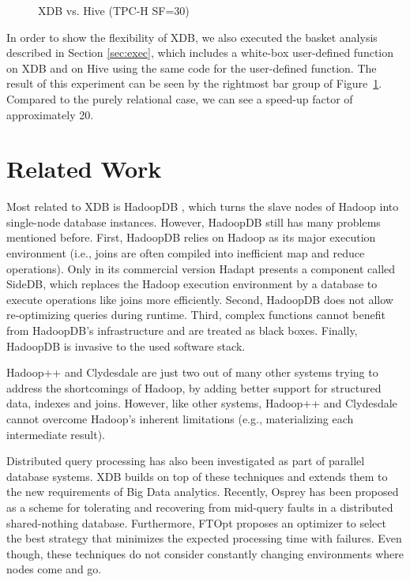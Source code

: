\documentclass{sig-alternate}
\begin{document}
\begin{figure}[ht] 
\hspace{-4ex}
\vspace{-3ex}
\caption{XDB vs. Hive (TPC-H SF=30)}
\vspace{-1ex}
\label{fig:perf}
\end{figure}

In order to show the flexibility of XDB, we also executed the basket analysis described in Section \ref{sec:exec}, which includes a white-box user-defined function on XDB and on Hive using the same code for the user-defined function. The result of this experiment can be seen by the rightmost bar group of Figure~\ref{fig:perf}. Compared to the purely relational case, we can see a speed-up factor of approximately 20. 

\section{Related Work}
\label{sec:rel}

Most related to XDB is HadoopDB \cite{HadoopDB:SIGMOD:2010}, which turns the slave nodes of Hadoop into single-node database instances. However, HadoopDB still has many problems mentioned before. First, HadoopDB relies on Hadoop as its major execution environment (i.e., joins are often compiled into inefficient map and reduce operations). Only in its commercial version Hadapt \cite{Hadapt:SIGMOD:2011} presents a component called SideDB, which replaces the Hadoop execution environment by a database to execute operations like joins more efficiently. Second, HadoopDB does not allow re-optimizing queries during runtime. Third, complex functions cannot benefit from HadoopDB's infrastructure and are treated as black boxes. Finally, HadoopDB is invasive to the used software stack. 

Hadoop++ \cite{HadoopPP:PVLDB:2010} and 	Clydesdale \cite{Clydesdale:EDBT:2012} are just two out of many other systems trying to address the shortcomings of Hadoop, by adding better support for structured data, indexes and joins. However, like other systems, Hadoop++ and Clydesdale cannot overcome Hadoop's inherent limitations (e.g., materializing each intermediate result).


Distributed query processing has also been investigated as part of parallel database systems. XDB builds on top of these techniques and extends them to the new requirements of Big Data analytics. Recently, Osprey \cite{Osprey:EDBT:2012} has been proposed as a scheme for tolerating and recovering from mid-query faults in a distributed shared-nothing database. Furthermore, FTOpt \cite{FOpt:SIGMOD:2011} proposes an optimizer to select the best strategy that minimizes the expected processing time with failures. Even though, these techniques do not consider constantly changing environments where nodes come and go.
\end{document}
